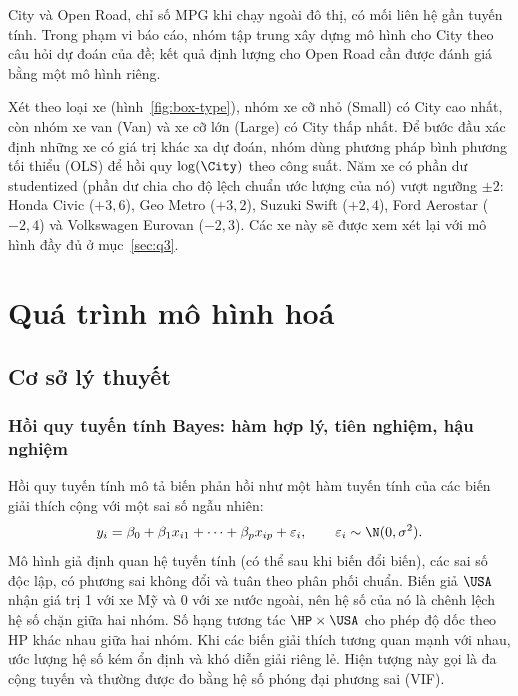 \documentclass[12pt,a4paper]{report}
\begin{document}
City và Open Road, chỉ số MPG khi chạy ngoài đô thị, có mối liên hệ gần tuyến
tính. Trong phạm vi báo cáo, nhóm tập trung xây dựng mô hình cho City theo câu
hỏi dự đoán của đề; kết quả định lượng cho Open Road cần được đánh giá bằng một
mô hình riêng.


Xét theo loại xe (hình~\ref{fig:box-type}), nhóm xe cỡ nhỏ (Small) có City cao
nhất, còn nhóm xe van (Van) và xe cỡ lớn (Large) có City thấp nhất. Để bước đầu
xác định những xe có giá trị khác xa dự đoán, nhóm dùng phương pháp bình phương
tối thiểu (OLS) để hồi quy $\log(\City)$ theo công suất. Năm xe có phần dư
studentized (phần dư chia cho độ lệch chuẩn ước lượng của nó) vượt ngưỡng
$\pm 2$: Honda Civic ($+3{,}6$), Geo Metro ($+3{,}2$), Suzuki Swift ($+2{,}4$), Ford
Aerostar ($-2{,}4$) và Volkswagen Eurovan ($-2{,}3$). Các xe này sẽ được xem xét
lại với mô hình đầy đủ ở mục~\ref{sec:q3}.


\chapter{Quá trình mô hình hoá}
\label{sec:modeling}

\section{Cơ sở lý thuyết}
\label{sec:theory}

\subsection{Hồi quy tuyến tính Bayes: hàm hợp lý, tiên nghiệm, hậu nghiệm}

Hồi quy tuyến tính mô tả biến phản hồi như một hàm tuyến tính của các biến giải
thích cộng với một sai số ngẫu nhiên:
%
\begin{equation}
  \label{eq:linreg}
  y_i = \beta_0 + \beta_1 x_{i1} + \dots + \beta_p x_{ip} + \varepsilon_i,
  \qquad \varepsilon_i \sim \N(0, \sigma^2).
\end{equation}
%
Mô hình giả định quan hệ tuyến tính (có thể sau khi biến đổi biến), các sai số
độc lập, có phương sai không đổi và tuân theo phân phối chuẩn. Biến giả $\USA$
nhận giá trị 1 với xe Mỹ và 0 với xe nước ngoài, nên hệ số của nó là chênh lệch
hệ số chặn giữa hai nhóm. Số hạng tương tác $\HP \times \USA$ cho phép độ dốc
theo HP khác nhau giữa hai nhóm. Khi các biến giải thích tương quan mạnh với
nhau, ước lượng hệ số kém ổn định và khó diễn giải riêng lẻ. Hiện tượng này gọi
là đa cộng tuyến và thường được đo bằng hệ số phóng đại phương sai (VIF).
\end{document}
